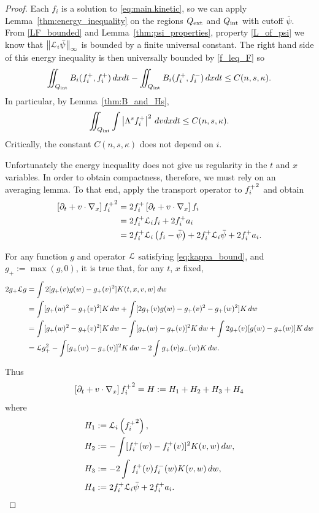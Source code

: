 \begin{proof}
Each $f_i$ is a solution to \eqref{eq:main.kinetic}, so we can apply Lemma~\ref{thm:energy_inequality} on the regions ${Q_\textrm{ext}}$ and ${Q_\textrm{int}}$ with cutoff $\bar{\psi}$.   From \eqref{LF_bounded} and Lemma~\ref{thm:psi_properties}, property \eqref{L_of_psi} we know that $\left\lVert\mathcal{L}_i\bar{\psi}\right\rVert_\infty$ is bounded by a finite universal constant.   The right hand side of this energy inequality is then universally bounded by \eqref{f_leq_F} so
\begin{equation}\label{Bs_are_bounded}
\iint_{Q_\textrm{int}} B_i({f_i^+},{f_i^+}) \,dxdt - \iint_{Q_\textrm{int}} B_i({f_i^+},{f_i^-}) \,dxdt \leq C(n,s,\kappa). 
\end{equation}
In particular, by Lemma~\ref{thm:B_and_Hs},
\begin{equation}\label{v_regularity_of_fip} 
\iint_{Q_\textrm{int}} \int \left\lvert \Lambda^s {f_i^+} \right\rvert^2 \,dvdxdt \leq C(n,s,\kappa). 
\end{equation}
Critically, the constant $C(n,s,\kappa)$ does not depend on $i$.  

Unfortunately the energy inequality does not give us regularity in the $t$ and $x$ variables. In order to obtain compactness, therefore, we must rely on an averaging lemma.  To that end, apply the transport operator to ${f_i^+}^2$ and obtain
\begin{align*} 
\left[ \partial_t + v\cdot \nabla_x \right] {f_i^+}^2 &= 2 {f_i^+} \left[ \partial_t + v\cdot \nabla_x \right] f_i
\\ &= 2 {f_i^+} \mathcal{L}_i f_i + 2 {f_i^+} a_i
\\ &= 2 {f_i^+} \mathcal{L}_i\left( f_i - \bar{\psi} \right) + 2 {f_i^+} \mathcal{L}_i \bar{\psi} + 2{f_i^+} a_i.
\end{align*}

For any function $g$ and operator $\mathcal{L}$ satisfying \eqref{eq:kappa_bound}, and $g_+ := \max(g,0)$, it is true that, for any $t$, $x$ fixed,
\begin{align*}
2 g_+ \mathcal{L} g &= \int 2 [g_+(v) g(w) - g_+(v)^2] K(t,x,v,w) \,dw
\\ &= \int [g_+(w)^2 - g_+(v)^2] K \,dw + \int [2 g_+(v) g(w) - g_+(v)^2 -  g_+(w)^2] K \,dw
\\ &= \int [g_+(w)^2 - g_+(v)^2] K \,dw - \int [g_+(w) - g_+(v)]^2 K \,dw + \int 2 g_+(v) [g(w) - g_+(w)] K \,dw
\\ &= \mathcal{L} g_+^2 - \int [g_+(w) - g_+(v)]^2 K \,dw - 2 \int g_+(v)g_-(w) K \,dw.
\end{align*}

Thus
\[ \left[ \partial_t + v\cdot \nabla_x \right] {f_i^+}^2 = H := H_1 + H_2 + H_3 + H_4 \]
where
\begin{align*} 
H_1 &:= \mathcal{L}_i \left( {f_i^+}^2 \right),
\\ H_2 &:= - \int [{f_i^+}(w) - {f_i^+}(v)]^2 K(v,w) \,dw,
\\ H_3 &:= - 2 \int {f_i^+}(v){f_i^-}(w) K(v,w) \,dw,
\\ H_4 &:=  2 {f_i^+} \mathcal{L}_i \bar{\psi} + 2 {f_i^+} a_i.
\end{align*}


\end{proof}
